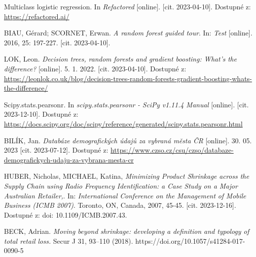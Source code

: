 \begin{thebibliography}{1}
Multiclass logistic regression. In \textit{Refactored} [online]. [cit. 2023-04-10]. Dostupné z: \url{https://refactored.ai/}

BIAU, Gérard; SCORNET, Erwan. \textit{A random forest guided tour}. In: \textit{Test} [online]. 2016, 25: 197-227. [cit. 2023-04-10].

LOK, Leon. \textit{Decision trees, random forests and gradient boosting: What's the difference?} [online]. 5. 1. 2022. [cit. 2023-04-10]. Dostupné z: \url{https://leonlok.co.uk/blog/decision-trees-random-forests-gradient-boosting-whats-the-difference/}

Scipy.stats.pearsonr. In \textit{scipy.stats.pearsonr - SciPy v1.11.4 Manual} [online]. [cit. 2023-12-10]. Dostupné z: \url{https://docs.scipy.org/doc/scipy/reference/generated/scipy.stats.pearsonr.html} 

BILÍK, Jan. \textit{Databáze demografických údajů za vybraná města ČR} [online]. 30. 05. 2023 [cit. 2023-07-12]. Dostupné z: \url{https://www.czso.cz/csu/czso/databaze-demografickych-udaju-za-vybrana-mesta-cr}


HUBER, Nicholas, MICHAEL, Katina, \textit{Minimizing Product Shrinkage across the Supply Chain using Radio Frequency Identification: a Case Study on a Major Australian Retailer,}. In: \textit{International Conference on the Management of Mobile Business (ICMB 2007)}. Toronto, ON, Canada, 2007, 45-45. [cit. 2023-12-16]. Dostupné z: doi: 10.1109/ICMB.2007.43.

BECK, Adrian. \textit{Moving beyond shrinkage: developing a definition and typology of total retail loss.} Secur J 31, 93–110 (2018). https://doi.org/10.1057/s41284-017-0090-5

\end{thebibliography}
	
% 
	
	